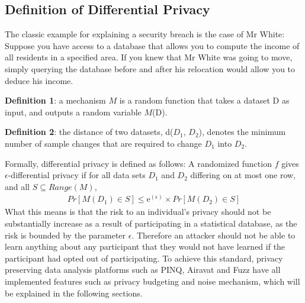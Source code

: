 \subsection{Definition of Differential Privacy}
The classic example for explaining a security breach is the case of Mr White: Suppose you have access to a database that allows you to compute the income of all residents in a specified area. If you knew that Mr White was going to move, simply querying the database before and after his relocation would allow you to deduce his income. 

\textbf{Definition 1}: a mechanism $M$ is a random function that takes a dataset D as input, and outputs a random variable $M$(D).

\textbf{Definition 2}: the distance of two datasets, d($D_1$, $D_2$), denotes the minimum number of sample changes that are required to change $D_1$ into $D_2$.

Formally, differential privacy is defined as follows:
A randomized function $f$ gives $\epsilon$-differential privacy if for all data sets $D_1$ and $D_2$ differing on at most one row, and all $S\subseteq Range(M)$,
\begin{eqnarray} \label{DiffPrivDef}
 Pr[M(D_1)\in S]\leq \mathrm{e}^{(\epsilon)}\times Pr[M(D_2)\in S]
 \end{eqnarray}
What this means is that the risk to an individual's privacy should not be substantially increase as a result of participating in a statistical database, as the risk is bounded by the parameter $\epsilon$. Therefore an attacker should not be able to learn anything about any participant that they would not have learned if the participant had opted out of participating. To achieve this standard, privacy preserving data analysis platforms such as PINQ\cite{mcsherry2009PINQ}, Airavat\cite{roy2010airavat} and Fuzz\cite{Haeberlen2011fuzz} have all implemented features such as privacy budgeting and noise mechanism, which will be explained in the following sections.  

